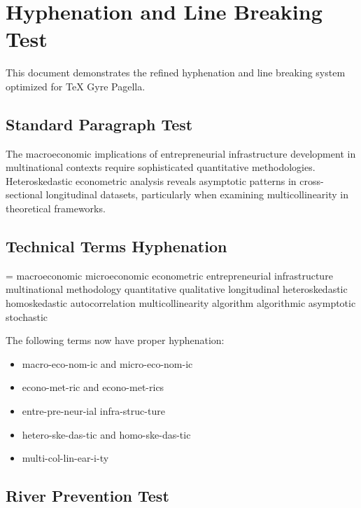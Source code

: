 \documentclass[11pt,a4paper]{article}
\newcommand{\showhyphens}[1]{%
  \setbox0\vbox{%
    \hsize=0pt
    \hfuzz=\maxdimen
    \noindent#1%
  }%
}
\begin{document}
\section{Hyphenation and Line Breaking Test}

This document demonstrates the refined hyphenation and line breaking system optimized for TeX Gyre Pagella.

\subsection{Standard Paragraph Test}

The macroeconomic implications of entrepreneurial infrastructure development in multinational contexts require sophisticated quantitative methodologies. Heteroskedastic econometric analysis reveals asymptotic patterns in cross-sectional longitudinal datasets, particularly when examining multicollinearity in theoretical frameworks.

\subsection{Technical Terms Hyphenation}

\showhyphens{macroeconomic microeconomic econometric entrepreneurial infrastructure multinational methodology quantitative qualitative longitudinal heteroskedastic homoskedastic autocorrelation multicollinearity algorithm algorithmic asymptotic stochastic}

The following terms now have proper hyphenation:
\begin{itemize}
\item macro-eco-nom-ic and micro-eco-nom-ic
\item econo-met-ric and econo-met-rics
\item entre-pre-neur-ial infra-struc-ture
\item hetero-ske-das-tic and homo-ske-das-tic
\item multi-col-lin-ear-i-ty
\end{itemize}

\subsection{River Prevention Test}

\end{document}
